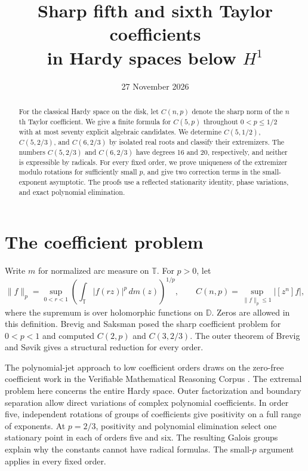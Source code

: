 \documentclass[11pt]{article}
\title{Sharp fifth and sixth Taylor coefficients\\
in Hardy spaces below \texorpdfstring{$H^1$}{H1}}
\author{}
\date{27 November 2026}
\newcommand{\D}{\mathbb D}
\newcommand{\T}{\mathbb T}
\begin{document}
\maketitle

\begin{abstract}
For the classical Hardy space on the disk, let \(C(n,p)\) denote
the sharp norm of the \(n\)th Taylor coefficient. We give a finite
formula for \(C(5,p)\) throughout \(0<p\leq1/2\) with at most seventy
explicit algebraic candidates. We determine \(C(5,1/2)\),
\(C(5,2/3)\), and \(C(6,2/3)\) by isolated real roots and classify
their extremizers. The numbers \(C(5,2/3)\) and \(C(6,2/3)\) have
degrees 16 and 20, respectively, and neither is expressible
by radicals. For every fixed order, we prove uniqueness of the
extremizer modulo rotations for sufficiently small \(p\), and give
two correction terms in the small-exponent asymptotic. The proofs use a
reflected stationarity identity, phase variations, and exact
polynomial elimination.
\end{abstract}

\section{The coefficient problem}

Write \(m\) for normalized arc measure on \(\T\). For \(p>0\), let
\[
 \|f\|_p=\sup_{0<r<1}
 \left(\int_{\T}|f(rz)|^p\,dm(z)\right)^{1/p},\qquad
 C(n,p)=\sup_{\|f\|_p\leq1}|[z^n]f| ,
\]
where the supremum is over holomorphic functions on \(\D\). Zeros
are allowed in this definition. Brevig and Saksman
\cite{BrevigSaksman} posed the sharp coefficient problem for \(0<p<1\)
and computed \(C(2,p)\) and \(C(3,2/3)\). The outer theorem of Brevig
and S{\o}vik \cite{BrevigSovik} gives a structural reduction for
every order.

The polynomial-jet approach to low coefficient orders draws on
the zero-free coefficient work in the Verifiable Mathematical
Reasoning Corpus \cite{VMRC}. The extremal problem here concerns
the entire Hardy space. Outer factorization and boundary
separation allow direct variations of complex polynomial
coefficients. In order five, independent rotations of groups of
coefficients give positivity on a full range of exponents. At
\(p=2/3\), positivity and polynomial elimination select one
stationary point in each of orders five and six. The resulting
Galois groups explain why the constants cannot have radical
formulas. The small-\(p\) argument applies in every fixed order.
\end{document}
